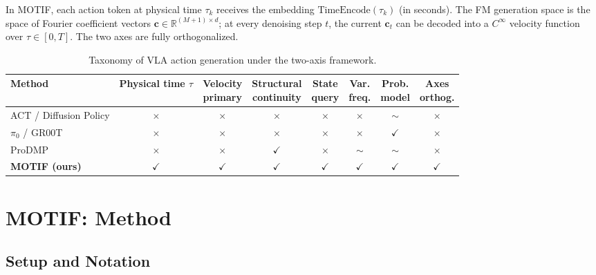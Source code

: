 \documentclass[11pt]{article}
\theoremstyle{plain}
\theoremstyle{definition}
\newcommand{\R}{\mathbb{R}}
\newcommand{\tdiff}{t}
\newcommand{\texec}{\tau}
\newcommand{\ccoeff}{\mathbf{c}}
\begin{document}
In MOTIF, each action token at physical time $\texec_k$ receives the
embedding $\text{TimeEncode}(\texec_k)$ (in seconds).
The FM generation space is the space of Fourier coefficient vectors
$\ccoeff \in \R^{(M+1)\times d}$; at every denoising step $\tdiff$,
the current $\ccoeff_\tdiff$ can be decoded into a $C^\infty$ velocity
function over $\texec \in [0,T]$.
The two axes are fully orthogonalized.

\begin{table}[ht]
\centering
\caption{Taxonomy of VLA action generation under the two-axis framework.}
\label{tab:taxonomy}
\setlength{\tabcolsep}{5pt}
\begin{tabular}{lccccccc}
\toprule
\textbf{Method} &
\makecell{Physical\\time $\texec$} &
\makecell{Velocity\\primary} &
\makecell{Structural\\continuity} &
\makecell{State\\query} &
\makecell{Var.\\freq.} &
\makecell{Prob.\\model} &
\makecell{Axes\\orthog.} \\
\midrule
ACT / Diffusion Policy  & $\times$ & $\times$ & $\times$ & $\times$ & $\times$ & $\sim$ & $\times$ \\
$\pi_0$ / GR00T         & $\times$ & $\times$ & $\times$ & $\times$ & $\times$ & $\checkmark$ & $\times$ \\
ProDMP                  & $\times$ & $\times$ & $\checkmark$ & $\times$ & $\sim$ & $\sim$ & $\times$ \\
\textbf{MOTIF (ours)}   & $\checkmark$ & $\checkmark$ & $\checkmark$ & $\checkmark$ & $\checkmark$ & $\checkmark$ & $\checkmark$ \\
\bottomrule
\end{tabular}
\end{table}

\section{MOTIF: Method}
\label{sec:method}

\subsection{Setup and Notation}
\end{document}
